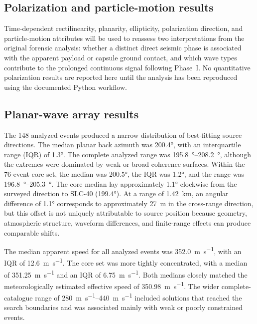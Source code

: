 \documentclass[]{seismica}
\begin{document}
\subsection{Polarization and particle-motion results}
\label{sec:results_polarization}

Time-dependent rectilinearity, planarity, ellipticity, polarization direction,
and particle-motion attributes will be used to reassess two interpretations
from the original forensic analysis: whether a distinct direct seismic phase
is associated with the apparent payload or capsule ground contact, and which
wave types contribute to the prolonged continuous signal following Phase~I.
No quantitative polarization results are reported here until the analysis has
been reproduced using the documented Python workflow.


\subsection{Planar-wave array results}
\label{sec:results_array}

The 148 analyzed events produced a narrow distribution of best-fitting source
directions. The median planar back azimuth was \ang{200.4}, with an
interquartile range (IQR) of \ang{1.3}. The complete analyzed range was
\SIrange{195.8}{208.2}{\degree}, although the extremes were dominated by weak or broad
coherence surfaces. Within the 76-event core set, the median was \ang{200.5},
the IQR was \ang{1.2}, and the range was \SIrange{196.8}{205.3}{\degree}. The core
median lay approximately \ang{1.1} clockwise from the surveyed direction to
SLC-40 (\ang{199.4}). At a range of \SI{1.42}{\kilo\metre}, an angular
difference of \ang{1.1} corresponds to approximately \SI{27}{\metre} in the
cross-range direction, but this offset is not uniquely attributable to source
position because geometry, atmospheric structure, waveform differences, and
finite-range effects can produce comparable shifts.

The median apparent speed for all analyzed events was
\SI{352.0}{\metre\per\second}, with an IQR of
\SI{12.6}{\metre\per\second}. The core set was more tightly concentrated, with
a median of \SI{351.25}{\metre\per\second} and an IQR of
\SI{6.75}{\metre\per\second}. Both medians closely matched the
meteorologically estimated effective speed of
\SI{350.98}{\metre\per\second}. The wider complete-catalogue range of
\SIrange{280}{440}{\metre\per\second} included solutions that reached the
search boundaries and was associated mainly with weak or poorly constrained
events.
\end{document}

